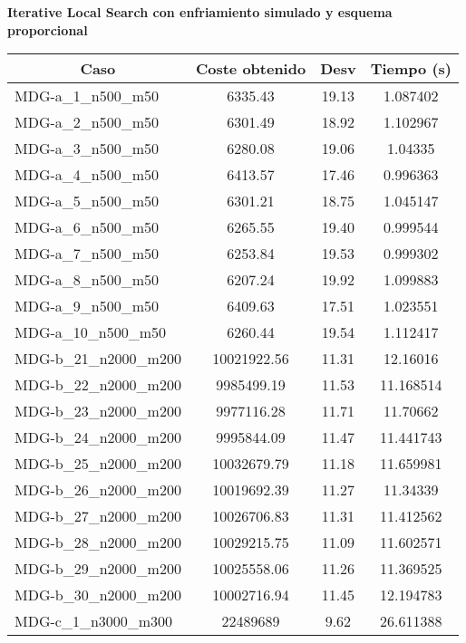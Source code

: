 \documentclass[11pt,a4paper]{article}
\begin{document}
\newpage
\textbf{Iterative Local Search con enfriamiento simulado y esquema proporcional}
\begin{table}[H]
	\begin{center}
		\begin{tabular}{|l|c|c|c|} 
			\hline
			\multicolumn{1}{|c|}{\textbf{Caso}} & \textbf{Coste obtenido} & \textbf{Desv} & \textbf{Tiempo (s)} \\ \hline
					MDG-a\_1\_n500\_m50 & 6335.43 & 19.13 & 1.087402 \\ \hline
					MDG-a\_2\_n500\_m50 & 6301.49 & 18.92 & 1.102967 \\ \hline
					MDG-a\_3\_n500\_m50 & 6280.08 & 19.06 & 1.04335 \\ \hline
					MDG-a\_4\_n500\_m50 & 6413.57 & 17.46 & 0.996363 \\ \hline
					MDG-a\_5\_n500\_m50 & 6301.21 & 18.75 & 1.045147 \\ \hline
					MDG-a\_6\_n500\_m50 & 6265.55 & 19.40 & 0.999544 \\ \hline
					MDG-a\_7\_n500\_m50 & 6253.84 & 19.53 & 0.999302 \\ \hline
					MDG-a\_8\_n500\_m50 & 6207.24 & 19.92 & 1.099883 \\ \hline
					MDG-a\_9\_n500\_m50 & 6409.63 & 17.51 & 1.023551 \\ \hline
					MDG-a\_10\_n500\_m50 & 6260.44 & 19.54 & 1.112417 \\ \hline
					MDG-b\_21\_n2000\_m200 & 10021922.56 & 11.31 & 12.16016 \\ \hline
					MDG-b\_22\_n2000\_m200 & 9985499.19 & 11.53 & 11.168514 \\ \hline
					MDG-b\_23\_n2000\_m200 & 9977116.28 & 11.71 & 11.70662 \\ \hline
					MDG-b\_24\_n2000\_m200 & 9995844.09 & 11.47 & 11.441743 \\ \hline
					MDG-b\_25\_n2000\_m200 & 10032679.79 & 11.18 & 11.659981 \\ \hline
					MDG-b\_26\_n2000\_m200 & 10019692.39 & 11.27 & 11.34339 \\ \hline
					MDG-b\_27\_n2000\_m200 & 10026706.83 & 11.31 & 11.412562 \\ \hline
					MDG-b\_28\_n2000\_m200 & 10029215.75 & 11.09 & 11.602571 \\ \hline
					MDG-b\_29\_n2000\_m200 & 10025558.06 & 11.26 & 11.369525 \\ \hline
					MDG-b\_30\_n2000\_m200 & 10002716.94 & 11.45 & 12.194783 \\ \hline
					MDG-c\_1\_n3000\_m300 & 22489689 & 9.62 & 26.611388 \\ \hline

\end{tabular}
\end{center}
\end{table}
\end{document}

